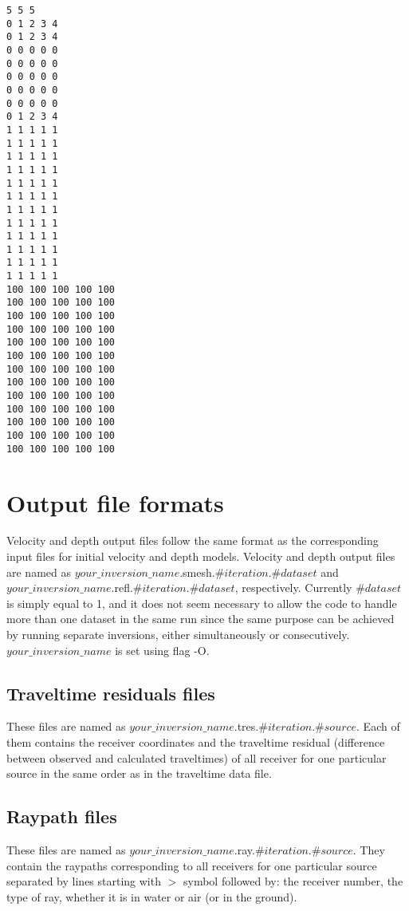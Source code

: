 \documentclass[twoside,final,onecolumn]{article}
\begin{document}
\begin{verbatim}
5 5 5
0 1 2 3 4
0 1 2 3 4
0 0 0 0 0
0 0 0 0 0
0 0 0 0 0
0 0 0 0 0
0 0 0 0 0
0 1 2 3 4
1 1 1 1 1
1 1 1 1 1
1 1 1 1 1
1 1 1 1 1
1 1 1 1 1
1 1 1 1 1
1 1 1 1 1
1 1 1 1 1
1 1 1 1 1
1 1 1 1 1
1 1 1 1 1
1 1 1 1 1
100 100 100 100 100
100 100 100 100 100
100 100 100 100 100
100 100 100 100 100
100 100 100 100 100
100 100 100 100 100
100 100 100 100 100
100 100 100 100 100
100 100 100 100 100
100 100 100 100 100
100 100 100 100 100
100 100 100 100 100
100 100 100 100 100
\end{verbatim}

\section{Output file formats}
Velocity and depth output files follow the same format as the corresponding input files for initial velocity and depth models.
Velocity and depth output files are named as $your\_inversion\_name$.smesh.$\#iteration$.$\#dataset$ and $your\_inversion\_name$.refl.$\#iteration$.$\#dataset$, respectively.
Currently $\#dataset$ is simply equal to 1, and it does not seem necessary to allow the code to handle more than one dataset in the same run
since the same purpose can be achieved by running separate inversions, either simultaneously or consecutively. $your\_inversion\_name$ is set using flag -O.

\subsection{Traveltime residuals files}

These files are named as $your\_inversion\_name$.tres.$\#iteration$.$\#source$.
Each of them contains the receiver coordinates and the traveltime residual (difference between observed and calculated traveltimes)
of all receiver for one particular source in the same order as in the traveltime data file.

\subsection{Raypath files}

These files are named as $your\_inversion\_name$.ray.$\#iteration$.$\#source$.
They contain the raypaths corresponding to all receivers for one particular source separated by lines starting with $>$ symbol followed by:
the receiver number, the type of ray, whether it is in water or air (or in the ground).
\end{document}
